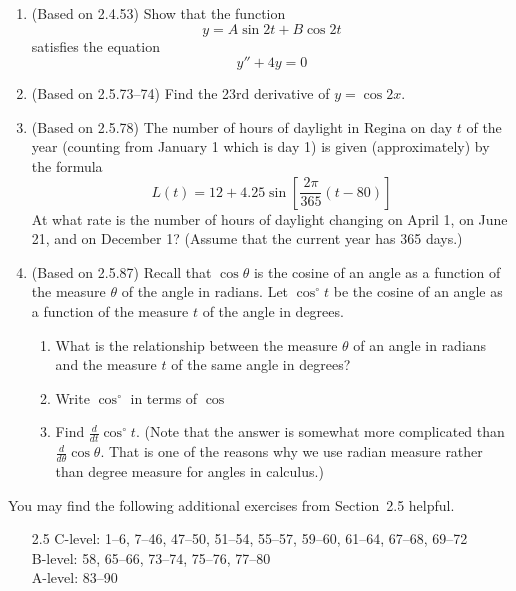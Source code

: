 \documentclass{article}
\newcommand{\ds}{\displaystyle}
\begin{document}
\begin{enumerate}
\item (Based on 2.4.53) %
  Show that the function
  \begin{equation*}
    y = A \sin 2t + B \cos 2t
  \end{equation*}
  satisfies the equation
  \begin{equation*}
    y'' + 4y = 0
  \end{equation*}
\item (Based on 2.5.73--74) %
  Find the 23rd derivative of $y=\cos 2x$.
\item (Based on 2.5.78) %
  The number of hours of daylight in Regina on day $t$ of the year
  (counting from January 1 which is day 1) is given (approximately) by
  the formula
  \begin{equation*}
    L(t) = 12 + 4.25 \sin \left[ \frac{2\pi}{365} (t-80) \right]
  \end{equation*}
  At what rate is the number of hours of daylight changing on April 1,
  on June 21, and on December 1?  (Assume that the current year has
  365 days.)
\item (Based on 2.5.87) %
  Recall that $\cos \theta$ is the cosine of an angle as a function of
  the measure $\theta$ of the angle in radians.  Let $\cos^{\circ} t$
  be the cosine of an angle as a function of the measure $t$ of the
  angle in degrees.
  \begin{enumerate}
  \item What is the relationship between the measure $\theta$ of an
    angle in radians and the measure $t$ of the same angle in degrees? 
  \item Write $\cos^{\circ}$ in terms of $\cos$
  \item Find $\ds \frac{d}{dt} \cos^{\circ} t$.  (Note that the answer
    is somewhat more complicated than $\ds \frac{d}{d\theta} \cos
    \theta$.  That is one of the reasons why we use radian measure
    rather than degree measure for angles in calculus.)
  \end{enumerate}
\end{enumerate}

\noindent
You may find the following additional exercises from Section~2.5
helpful.
\begin{itemize}
\item[2.5] 
  C-level: 1--6, 7--46, 47--50, 51--54, 55--57, 59--60, 61--64,
  67--68, 69--72 \\ 
  B-level: 58, 65--66, 73--74, 75--76, 77--80 \\
  A-level: 83--90
\end{itemize}
\end{document}
